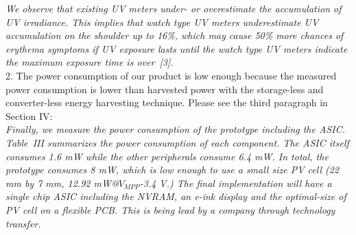 \documentclass[onecolumn]{IEEEconf}
\begin{document}
\begin{description}
\textit{We observe that existing UV meters under- or overestimate the accumulation of UV irradiance.
This implies that watch type UV meters underestimate UV accumulation on the shoulder up to 16\%, which may cause 50\% more chances of erythema symptoms if UV exposure lasts until the watch type UV meters indicate the maximum exposure time is over~[3].}\\

2. The power consumption of our product is low enough because the measured power consumption is lower than harvested power with the storage-less and converter-less energy harvesting technique. Please see the third paragraph in Section IV:\\

\textit{Finally, we measure the power consumption of the prototype including the ASIC. Table~III summarizes the power consumption of each component. The ASIC itself consumes 1.6 mW while the other peripherals consume 6.4 mW. In total, the prototype consumes 8 mW, which is low enough to use a small size PV cell (22 mm by 7 mm, 12.92 mW@$V_{MPP}$-3.4 V.) The final implementation will have a single chip ASIC including the NVRAM, an e-ink display and the optimal-size of PV cell on a flexible PCB. This is being lead by a company through technology transfer.}

\end{description}
\end{document}

